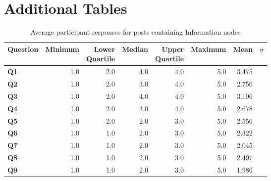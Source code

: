 \chapter{Additional Tables}

\begin{table}
\centering
\caption{Average participant responses for posts containing Information nodes}
\label{table:perception:information-average}
\begin{tabular}{ l | r | r | r | r | r | r | r}
\textbf{Question} & \textbf{Minimum} & \pbox{2cm}{\textbf{Lower}\\ \textbf{Quartile}} & \textbf{Median} & \pbox{2cm}{\textbf{Upper}\\ \textbf{Quartile}} & \textbf{Maximum} & \textbf{Mean} & \textbf{$\sigma$}\\
\hline
\textbf{Q1} &  1.0 & 2.0 & 4.0 & 4.0 & 5.0 & 3.475 &  \\
\hline
\textbf{Q2} &  1.0 & 2.0 & 3.0 & 4.0 & 5.0 & 2.756 &  \\
\hline
\textbf{Q3} &  1.0 & 2.0 & 4.0 & 4.0 & 5.0 & 3.196 &  \\
\hline
\textbf{Q4} &  1.0 & 2.0 & 3.0 & 4.0 & 5.0 & 2.678 &  \\
\hline
\textbf{Q5} &  1.0 & 2.0 & 2.0 & 3.0 & 5.0 & 2.556 &  \\
\hline
\textbf{Q6} &  1.0 & 1.0 & 2.0 & 3.0 & 5.0 & 2.322 &  \\
\hline
\textbf{Q7} &  1.0 & 1.0 & 2.0 & 3.0 & 5.0 & 2.045 &  \\
\hline
\textbf{Q8} &  1.0 & 1.0 & 2.0 & 3.0 & 5.0 & 2.497 &  \\
\hline
\textbf{Q9} &  1.0 & 1.0 & 2.0 & 3.0 & 5.0 & 1.986 &  \\
\end{tabular}
\end{table}




